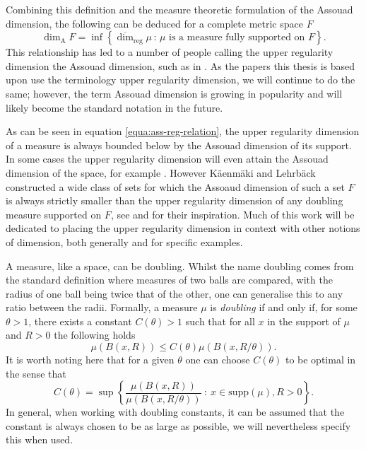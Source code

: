 Combining this definition and the measure theoretic formulation of the Assouad dimension, the following can be deduced for a complete metric space $F$
\begin{equation}\label{equa:ass-reg-relation}
    \dim_{\text{A}} F = \inf \left\{ \overline{\dim}_{\text{reg}} \mu \,  \colon \, \mu \text{ is a measure fully supported on } F\right\}.
\end{equation}
This relationship has led to a number of people calling the upper regularity dimension the Assouad dimension, such as in \cite{hare-hare-tros, hare-troscheit, fraser-kaenmaki-proj}. As the papers this thesis is based upon use the terminology upper regularity dimension, we will continue to do the same; however, the term Assouad dimension is growing in popularity and will likely become the standard notation in the future.

As can be seen in equation \eqref{equa:ass-reg-relation}, the upper regularity dimension of a measure is always bounded below by the Assouad dimension of its support. In some cases the upper regularity dimension will even attain the Assouad dimension of the space, for example \cite[Theorem 2.3]{fraser-howroyd1}. However K\"aenm\"aki and Lehrb\"ack constructed a wide class of sets for which the Assoaud dimension of such a set $F$ is always strictly smaller than the upper regularity dimension of any doubling measure supported on $F$, see  \cite{anti2} and \cite{konyagin} for their inspiration. Much of this work will be dedicated to placing the upper regularity dimension in context with other notions of dimension, both generally and for specific examples.

A measure, like a space, can be doubling. Whilst the name doubling comes from the standard definition where measures of two balls are compared, with the radius of one ball being twice that of the other, one can generalise this to any ratio between the radii. Formally, a measure $\mu$ is \textit{doubling} if and only if, for some $\theta > 1$, there exists a constant $C(\theta) > 1$ such that for all $x$ in the support of $\mu$ and $R > 0$ the following holds
\begin{equation}\label{doubling-equa}
    \mu(B(x,R)) \le C(\theta) \mu(B(x,R/\theta)).
\end{equation}
It is worth noting here that for a given $\theta$ one can choose $C(\theta)$ to be optimal in the sense that 
\[
C(\theta) = \sup \left\{ \frac{\mu(B(x,R))}{\mu(B(x,R/\theta))} \ : \ x \in \text{supp}(\mu), R>0 \right\}.
\]
In general, when working with doubling constants, it can be assumed that the constant is always chosen to be as large as possible, we will nevertheless specify this when used.

